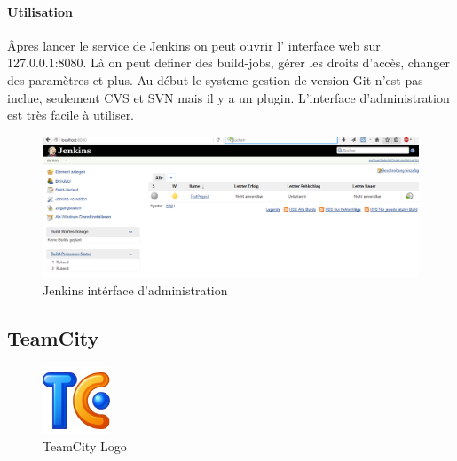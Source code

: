 \paragraph{Utilisation} Âpres lancer le service de Jenkins on peut ouvrir l' interface web sur 127.0.0.1:8080. Là on peut definer des build-jobs, gérer les droits d'accès, changer des paramètres et plus. Au début le systeme gestion de version Git n'est pas inclue, seulement CVS et SVN mais il y a un plugin. L'interface d'administration est très facile à utiliser.
\begin{figure}[H]
	\centering
		\includegraphics[width=15cm]{bilder/JenkinsGui}
	\caption{Jenkins intérface d'administration}
	\label{fig:jenkinsgui}
\end{figure}













\clearpage
\subsection{TeamCity}
\begin{figure}
  \begin{center}
    \includegraphics[width=0.18\textwidth]{bilder/teamcity512}
  \end{center}
  \caption{TeamCity Logo}
\end{figure}

